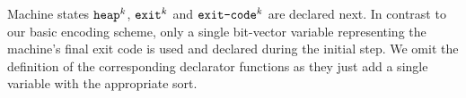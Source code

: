 




%






\noindent
Machine states $\texttt{heap}^k$, $\texttt{exit}^k$ and $\texttt{exit-code}^k$ are declared next.
In contrast to our basic encoding scheme, only a single bit-vector variable representing the machine's final exit code is used and declared during the initial step.
We omit the definition of the corresponding declarator functions as they just add a single variable with the appropriate sort.

